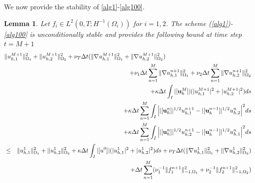 \documentclass[10pt]{article}%
\numberwithin{equation}{section}
\newtheorem{lemma}{Lemma}[section]
\newcommand{\bu}{{\bf u}}
\begin{document}
We now provide  the stability of  \eqref{alg1}-\eqref{alg100}.
\begin{lemma} \label{l:stab}
	Let $f_i\in L^2(0,T; H^{-1}(\Omega_i))$ for $i=1,2$. {The} scheme (\ref{alg1})-\eqref{alg100} is unconditionally stable and provides the following bound at time step $t=M+1$
	\begin{eqnarray}
	\lefteqn{\|{u^{M+1}_{h,1}}\|_{\Omega_1}^2 +\|{u^{M+1}_{h,2}}\|_{\Omega_2}^2+\nu_T\Delta t( \|\nabla  u_{h,1}^{M+1}\|^2_{\Omega_1}+\|\nabla  {u}_{h,2}^{M+1}\|^2_{\Omega_2})}\nonumber\\
	&&+\nu_1\Delta t \sum_{n=1}^M\|\nabla  u_{h,1}^{n+1}\|^2_{\Omega_1}+\nu_2\Delta t\sum_{n=1}^M\|\nabla  {u}_{h,2}^{n+1}\|^2_{\Omega_2}\nonumber\\&&+\kappa \Delta t \int_{I}|[\bu_h^M]| (|u_{h,1}^{M+1}|^2+|u_{h,2}^{M+1}|^2)ds\nonumber\\
	&&+\kappa \Delta t \sum_{n=1}^M \int_{I}\Big{|}|[\bu_h^n]|^{1/2}u_{h,1}^{n+1}-|[\bu_h^{n-1}]|^{1/2}u_{h,2}^{n}\Big{|}^2ds\nonumber\\
	&&+\kappa \Delta t \sum_{n=1}^M \int_{I}\Big{|}|[\bu_h^n]|^{1/2}u_{h,2}^{n+1}-|[\bu_h^{n-1}]|^{1/2}u_{h,1}^{n}\Big{|}^2ds \nonumber\\
	&\leq&\|{u^{1}_{h,1}}\|_{\Omega_1}^2+\|{u^{1}_{h,2}}\|_{\Omega_2}^2+\kappa \Delta t \int_{I}|[u^{0}]| (|u_{h,1}^{1}|^2+|u_{h,2}^{1}|^2)ds+\nu_T\Delta t( \|\nabla u_{h,1}^{1}\|_{\Omega_1}^2 +\|\nabla u_{h,2}^{1}\|_{\Omega_2}^2 )\nonumber\\&&+{\Delta t }\sum_{n=1}^M(\nu_1^{-1}\|f_1^{n+1}\|_{-1,\Omega_1}^2+\nu_2^{-1}\|f_2^{n+1}\|_{-1,\Omega_2}^2)\label{stb}
	\end{eqnarray}
\end{lemma}
\end{document}
